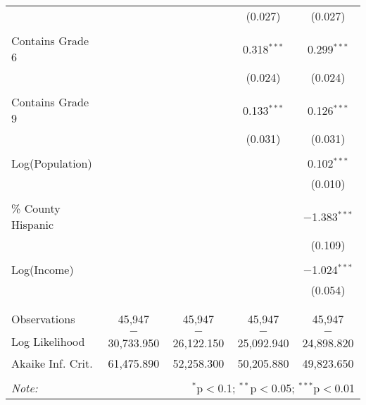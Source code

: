 \begin{table}[!htbp]
\begin{tabular}{@{\extracolsep{-2pt}}lcccc}
  &  &  & (0.027) & (0.027) \\ 
  & & & & \\ 
 Contains Grade 6 &  &  & 0.318$^{***}$ & 0.299$^{***}$ \\ 
  &  &  & (0.024) & (0.024) \\ 
  & & & & \\ 
 Contains Grade 9 &  &  & 0.133$^{***}$ & 0.126$^{***}$ \\ 
  &  &  & (0.031) & (0.031) \\ 
  & & & & \\ 
 Log(Population) &  &  &  & 0.102$^{***}$ \\ 
  &  &  &  & (0.010) \\ 
  & & & & \\ 
 \% County Hispanic &  &  &  & $-$1.383$^{***}$ \\ 
  &  &  &  & (0.109) \\ 
  & & & & \\ 
 Log(Income) &  &  &  & $-$1.024$^{***}$ \\ 
  &  &  &  & (0.054) \\ 
  & & & & \\ 
\hline \\[-1.8ex] 
Observations & 45,947 & 45,947 & 45,947 & 45,947 \\ 
Log Likelihood & $-$30,733.950 & $-$26,122.150 & $-$25,092.940 & $-$24,898.820 \\ 
Akaike Inf. Crit. & 61,475.890 & 52,258.300 & 50,205.880 & 49,823.650 \\ 
\hline 
\hline \\[-1.8ex] 
\textit{Note:}  & \multicolumn{4}{r}{$^{*}$p$<$0.1; $^{**}$p$<$0.05; $^{***}$p$<$0.01} \\ 
\end{tabular} 
\end{table} 

